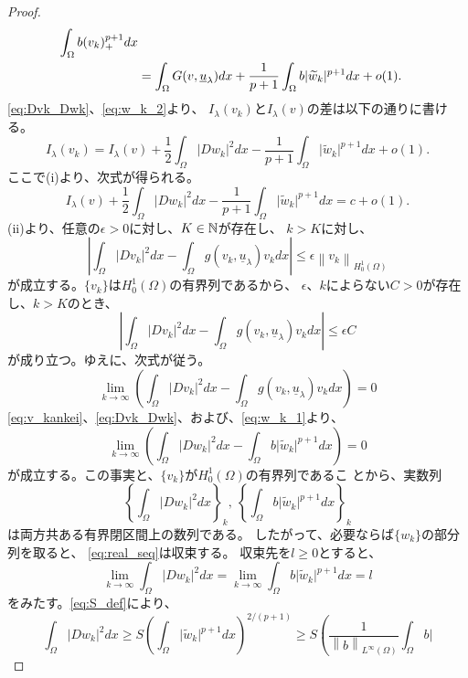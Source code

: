 \begin{proof}
\begin{align}
  \int_\Omega b (v_k)_+^{p+1} dx \notag \\
  &= \int_\Omega G(v, \underline{u}_\lambda) dx + \frac{1}{p+1}
  \int_\Omega b \lvert \tilde{w}_k \rvert^{p+1} dx + o(1). \label{eq:w_k_2}
 \end{align}
 \eqref{eq:Dvk_Dwk}、\eqref{eq:w_k_2}より、
 $I_\lambda(v_k)$と$I_\lambda(v)$の差は以下の通りに書ける。
 \[
  I_\lambda(v_k) = I_\lambda(v) + \frac{1}{2} \int_\Omega \lvert Dw_k
 \rvert^2 dx - \frac{1}{p+1} \int_\Omega \lvert \tilde{w}_k
 \rvert^{p+1} dx + o(1).
 \]
 ここで(i)より、次式が得られる。
 \begin{equation}
  I_\lambda(v) + \frac{1}{2} \int_\Omega \lvert Dw_k
   \rvert^2 dx - \frac{1}{p+1} \int_\Omega \lvert \tilde{w}_k
   \rvert^{p+1} dx = c + o(1). \label{eq:w_k_c}
 \end{equation}
 (ii)より、任意の$\epsilon > 0$に対し、$K \in \N$が存在し、
 $k > K$に対し、
 \[
 \left\lvert \int_\Omega \lvert Dv_k \rvert^2 dx - \int_\Omega g(v_k,
 \underline{u}_\lambda) v_k dx \right\rvert \leq \epsilon \left\| v_k
 \right\|_{H_0^1(\Omega)} 
 \]
 が成立する。$\{ v_k \}$は$H_0^1(\Omega)$の有界列であるから、
 $\epsilon$、$k$によらない$C > 0$が存在し、$k > K$のとき、
 \[
 \left\lvert \int_\Omega \lvert Dv_k \rvert^2 dx - \int_\Omega g(v_k,
 \underline{u}_\lambda) v_k dx \right\rvert \leq \epsilon C
 \]
 が成り立つ。ゆえに、次式が従う。
 \[
 \lim_{k \to \infty} \left( \int_\Omega \lvert Dv_k \rvert^2 dx -
 \int_\Omega g(v_k, \underline{u}_\lambda) v_k dx \right) = 0
 \]
 \eqref{eq:v_kankei}、\eqref{eq:Dvk_Dwk}、および、\eqref{eq:w_k_1}より、
 \[
 \lim_{k \to \infty} \left( \int_\Omega \lvert Dw_k \rvert^2 dx -
 \int_\Omega b \lvert \tilde{w}_k \rvert^{p+1} dx \right) = 0 
 \]
 が成立する。この事実と、$\{ v_k \}$が$H_0^1(\Omega)$の有界列であるこ
 とから、実数列
 \begin{equation}
  \left\{ \int_\Omega \lvert Dw_k \rvert^2 dx \right\}_k , \ 
  \left\{ \int_\Omega b \lvert \tilde{w}_k \rvert^{p+1} dx \right\}_k
  \label{eq:real_seq}
 \end{equation}
 は両方共ある有界閉区間上の数列である。
 したがって、必要ならば$\{ w_k \}$の部分列を取ると、
 \eqref{eq:real_seq}は収束する。
 収束先を$l \geq 0$とすると、
 \[
  \lim_{k \to \infty} \int_\Omega \lvert Dw_k \rvert^2 dx = \lim_{k
 \to \infty} \int_\Omega b \lvert \tilde{w}_k \rvert^{p+1} dx = l
 \]
 をみたす。\eqref{eq:S_def}により、
 \[
  \int_\Omega \lvert Dw_k \rvert^2 dx \geq S \left( \int_\Omega \lvert
 \tilde{w}_k \rvert^{p+1} dx \right)^{2/(p+1)} \geq S \left(
 \frac{1}{\left\| b \right\|_{L^\infty(\Omega)}} \int_\Omega b \lvert
\]
\end{proof}
